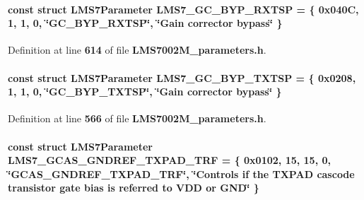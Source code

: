 \paragraph[{L\+M\+S7\+\_\+\+G\+C\+\_\+\+B\+Y\+P\+\_\+\+R\+X\+T\+SP}]{\setlength{\rightskip}{0pt plus 5cm}const struct {\bf L\+M\+S7\+Parameter} L\+M\+S7\+\_\+\+G\+C\+\_\+\+B\+Y\+P\+\_\+\+R\+X\+T\+SP = \{ 0x040\+C, 1, 1, 0, \char`\"{}\+G\+C\+\_\+\+B\+Y\+P\+\_\+\+R\+X\+T\+S\+P\char`\"{}, \char`\"{}\+Gain corrector bypass\char`\"{} \}\hspace{0.3cm}{\ttfamily [static]}}\label{LMS7002M__parameters_8h_aeef39fd8177df93efaff3913725f9416}


Definition at line {\bf 614} of file {\bf L\+M\+S7002\+M\+\_\+parameters.\+h}.

\paragraph[{L\+M\+S7\+\_\+\+G\+C\+\_\+\+B\+Y\+P\+\_\+\+T\+X\+T\+SP}]{\setlength{\rightskip}{0pt plus 5cm}const struct {\bf L\+M\+S7\+Parameter} L\+M\+S7\+\_\+\+G\+C\+\_\+\+B\+Y\+P\+\_\+\+T\+X\+T\+SP = \{ 0x0208, 1, 1, 0, \char`\"{}\+G\+C\+\_\+\+B\+Y\+P\+\_\+\+T\+X\+T\+S\+P\char`\"{}, \char`\"{}\+Gain corrector bypass\char`\"{} \}\hspace{0.3cm}{\ttfamily [static]}}\label{LMS7002M__parameters_8h_a3cc0554add0596c7646d9f05b44e2e62}


Definition at line {\bf 566} of file {\bf L\+M\+S7002\+M\+\_\+parameters.\+h}.

\paragraph[{L\+M\+S7\+\_\+\+G\+C\+A\+S\+\_\+\+G\+N\+D\+R\+E\+F\+\_\+\+T\+X\+P\+A\+D\+\_\+\+T\+RF}]{\setlength{\rightskip}{0pt plus 5cm}const struct {\bf L\+M\+S7\+Parameter} L\+M\+S7\+\_\+\+G\+C\+A\+S\+\_\+\+G\+N\+D\+R\+E\+F\+\_\+\+T\+X\+P\+A\+D\+\_\+\+T\+RF = \{ 0x0102, 15, 15, 0, \char`\"{}\+G\+C\+A\+S\+\_\+\+G\+N\+D\+R\+E\+F\+\_\+\+T\+X\+P\+A\+D\+\_\+\+T\+R\+F\char`\"{}, \char`\"{}\+Controls if the T\+X\+P\+A\+D cascode transistor gate bias is referred to V\+D\+D or G\+N\+D\char`\"{} \}\hspace{0.3cm}{\ttfamily [static]}}\label{LMS7002M__parameters_8h_a69317dfb4e9d69ccbb38657dd188e3d2}


